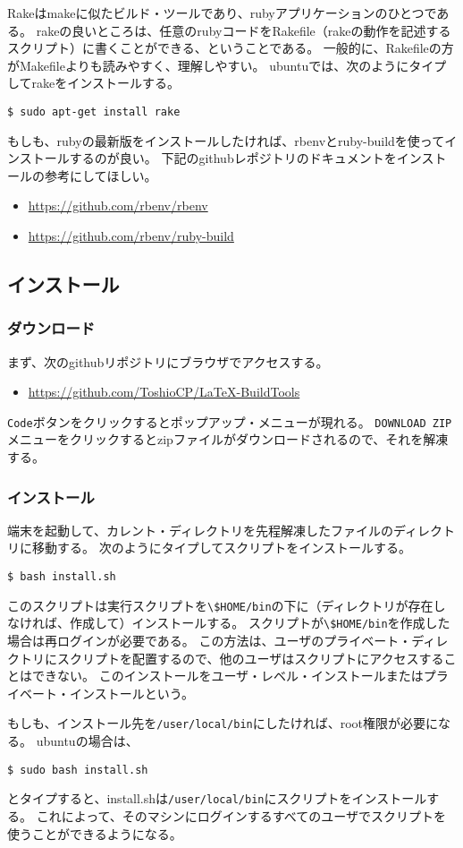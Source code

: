 Rakeはmakeに似たビルド・ツールであり、rubyアプリケーションのひとつである。
rakeの良いところは、任意のrubyコードをRakefile（rakeの動作を記述するスクリプト）に書くことができる、ということである。
一般的に、Rakefileの方がMakefileよりも読みやすく、理解しやすい。
ubuntuでは、次のようにタイプしてrakeをインストールする。
\begin{verbatim}
$ sudo apt-get install rake
\end{verbatim}

もしも、rubyの最新版をインストールしたければ、rbenvとruby-buildを使ってインストールするのが良い。
下記のgithubレポジトリのドキュメントをインストールの参考にしてほしい。
\begin{itemize}
\item \url{https://github.com/rbenv/rbenv}
\item \url{https://github.com/rbenv/ruby-build}
\end{itemize}

\subsection{インストール}
\subsubsection{ダウンロード}
まず、次のgithubリポジトリにブラウザでアクセスする。
\begin{itemize}
\item \url{https://github.com/ToshioCP/LaTeX-BuildTools}
\end{itemize}
\verb|Code|ボタンをクリックするとポップアップ・メニューが現れる。
\verb|DOWNLOAD ZIP|メニューをクリックするとzipファイルがダウンロードされるので、それを解凍する。
\subsubsection{インストール}
端末を起動して、カレント・ディレクトリを先程解凍したファイルのディレクトリに移動する。
次のようにタイプしてスクリプトをインストールする。
\begin{verbatim}
$ bash install.sh
\end{verbatim}
このスクリプトは実行スクリプトを\verb|\$HOME/bin|の下に（ディレクトリが存在しなければ、作成して）インストールする。
スクリプトが\verb|\$HOME/bin|を作成した場合は再ログインが必要である。
この方法は、ユーザのプライベート・ディレクトリにスクリプトを配置するので、他のユーザはスクリプトにアクセスすることはできない。
このインストールをユーザ・レベル・インストールまたはプライベート・インストールという。

もしも、インストール先を\verb|/user/local/bin|にしたければ、root権限が必要になる。
ubuntuの場合は、
\begin{verbatim}
$ sudo bash install.sh
\end{verbatim}
とタイプすると、install.shは\verb|/user/local/bin|にスクリプトをインストールする。
これによって、そのマシンにログインするすべてのユーザでスクリプトを使うことができるようになる。

